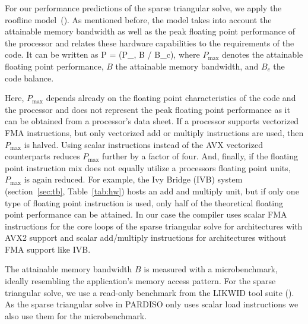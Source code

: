 For our performance predictions of the sparse triangular solve, we apply the roofline model~(\cite{williams-2009}).
As mentioned before, the model takes into account the attainable memory bandwidth as well as
the
peak floating
point performance of the processor and 
relates these hardware capabilities %
to
the requirements of the code.
It can be written as
%
\be
  P = \min(P_, B / B_c),
\ee
where $P_\text{max}$ denotes the attainable floating point performance, $B$ the
attainable memory bandwidth, and $B_c$ the code balance.

Here, $P_\text{max}$
depends already on the floating point characteristics of the code and the
processor and does not represent the peak floating point performance as it can
be obtained from a processor's data sheet. 
If a processor supports vectorized FMA instructions, but
only vectorized add or multiply instructions are used, then $P_\text{max}$ is
halved.
Using scalar instructions instead of the AVX vectorized counterparts reduces
$P_\text{max}$ further by a factor of four.
%
And, finally, if the floating point instruction mix does not equally utilize a
processors floating point units, $P_\text{max}$ is again reduced.
For example, the Ivy Bridge (IVB) system (section~\ref{sec:tb}, Table~\ref{tab:hw}) hosts an add and
multiply unit, but if only one type of floating point instruction is used, only
half of the theoretical floating
point performance can be attained. 
%
In our case the compiler uses 
scalar FMA instructions
for the core loops of the %
sparse triangular solve
for architectures
with AVX2 support and scalar add/multiply instructions for
architectures without FMA support like IVB.

The attainable memory bandwidth $B$ is measured with a microbenchmark,
ideally resembling the application's memory access pattern. 
For the
sparse triangular solve,
we use a read-only benchmark from the LIKWID tool suite (\cite{likwid-2010-arxiv}).
%
As the sparse triangular solve
in PARDISO only uses scalar load instructions we also use them
for the microbenchmark. 

